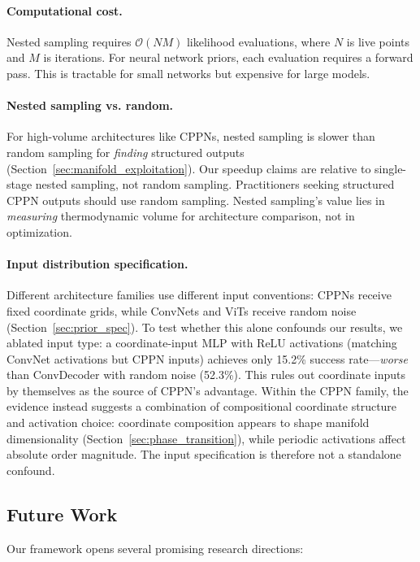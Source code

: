 \documentclass{article}
\begin{document}
\paragraph{Computational cost.} Nested sampling requires $\mathcal{O}(NM)$ likelihood evaluations, where $N$ is live points and $M$ is iterations. For neural network priors, each evaluation requires a forward pass. This is tractable for small networks but expensive for large models.

\paragraph{Nested sampling vs. random.} For high-volume architectures like CPPNs, nested sampling is slower than random sampling for \emph{finding} structured outputs (Section~\ref{sec:manifold_exploitation}). Our speedup claims are relative to single-stage nested sampling, not random sampling. Practitioners seeking structured CPPN outputs should use random sampling. Nested sampling's value lies in \emph{measuring} thermodynamic volume for architecture comparison, not in optimization.

\paragraph{Input distribution specification.} Different architecture families use different input conventions: CPPNs receive fixed coordinate grids, while ConvNets and ViTs receive random noise (Section~\ref{sec:prior_spec}). To test whether this alone confounds our results, we ablated input type: a coordinate-input MLP with ReLU activations (matching ConvNet activations but CPPN inputs) achieves only 15.2\% success rate---\emph{worse} than ConvDecoder with random noise (52.3\%). This rules out coordinate inputs by themselves as the source of CPPN's advantage. Within the CPPN family, the evidence instead suggests a combination of compositional coordinate structure and activation choice: coordinate composition appears to shape manifold dimensionality (Section~\ref{sec:phase_transition}), while periodic activations affect absolute order magnitude. The input specification is therefore not a standalone confound.

\subsection{Future Work}

Our framework opens several promising research directions:
\end{document}
